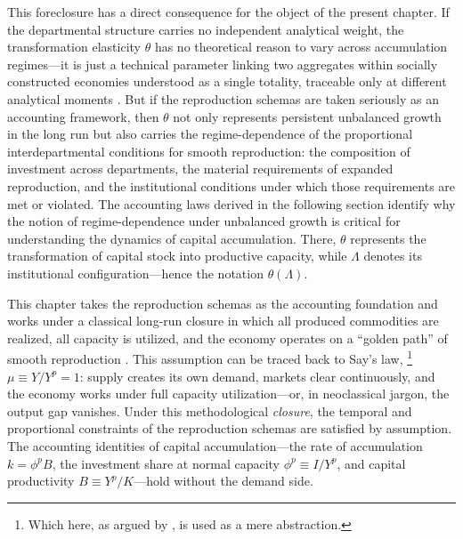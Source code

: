 \documentclass[11pt,a4paper]{article}
\begin{document}
This foreclosure has a direct consequence for the object of the present chapter. If the departmental structure carries no independent analytical weight, the transformation elasticity $\theta$ has no theoretical reason to vary across accumulation regimes---it is just a technical parameter linking two aggregates within socially constructed economies understood as a single totality, traceable only at different analytical moments \citep{Vidal2012}. But if the reproduction schemas are taken seriously as an accounting framework, then $\theta$ not only represents persistent unbalanced growth in the long run but also carries the regime-dependence of the proportional interdepartmental conditions for smooth reproduction: the composition of investment across departments, the material requirements of expanded reproduction, and the institutional conditions under which those requirements are met or violated. The accounting laws derived in the following section identify why the notion of regime-dependence under unbalanced growth is critical for understanding the dynamics of capital accumulation. There, $\theta$ represents the transformation of capital stock into productive capacity, while $\Lambda$ denotes its institutional configuration---hence the notation $\theta(\Lambda)$.

This chapter takes the reproduction schemas as the accounting foundation and works under a classical long-run closure in which all produced commodities are realized, all capacity is utilized, and the economy operates on a ``golden path'' of smooth reproduction \citep{Basu2022}. This assumption can be traced back to Say's law,%
\footnote{Which here, as argued by \citet{Foley1985}, is used as a mere abstraction.}
$\mu \equiv Y/Y^p = 1$: supply creates its own demand, markets clear continuously, and the economy works under full capacity utilization---or, in neoclassical jargon, the output gap vanishes. Under this methodological \emph{closure}, the temporal and proportional constraints of the reproduction schemas are satisfied by assumption. The accounting identities of capital accumulation---the rate of accumulation $k = \phi^p B$, the investment share at normal capacity $\phi^p \equiv I/Y^p$, and capital productivity $B \equiv Y^p/K$---hold without the demand side.
\end{document}
